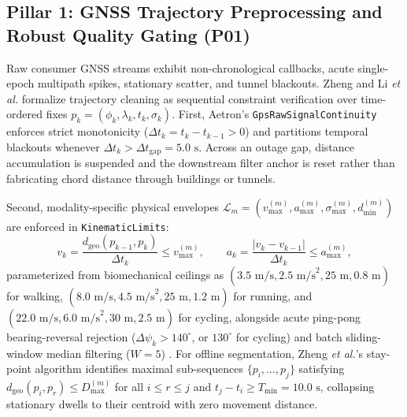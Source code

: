 \documentclass[journal]{IEEEtran}
\begin{document}
\subsection{Pillar 1: GNSS Trajectory Preprocessing and Robust Quality Gating (P01)}
Raw consumer GNSS streams exhibit non-chronological callbacks, acute single-epoch multipath spikes, stationary scatter, and tunnel blackouts. Zheng \cite{zheng2015trajectory} and Li \emph{et al.} \cite{li2025trajectory} formalize trajectory cleaning as sequential constraint verification over time-ordered fixes $p_k = (\phi_k, \lambda_k, t_k, \sigma_k)$. First, Aetron's \texttt{GpsRawSignalContinuity} enforces strict monotonicity ($\Delta t_k = t_k - t_{k-1} > 0$) and partitions temporal blackouts whenever $\Delta t_k > \Delta t_{\text{gap}} = 5.0\text{ s}$. Across an outage gap, distance accumulation is suspended and the downstream filter anchor is reset rather than fabricating chord distance through buildings or tunnels.

Second, modality-specific physical envelopes $\mathcal{L}_m = (v_{\max}^{(m)}, a_{\max}^{(m)}, \sigma_{\max}^{(m)}, d_{\min}^{(m)})$ are enforced in \texttt{KinematicLimits}:
\begin{equation}
  v_k = \frac{d_{\text{geo}}(p_{k-1}, p_k)}{\Delta t_k} \le v_{\max}^{(m)}, \qquad
  a_k = \frac{|v_k - v_{k-1}|}{\Delta t_k} \le a_{\max}^{(m)},
  \label{eq:p01_kinematic}
\end{equation}
parameterized from biomechanical ceilings as $(3.5\text{ m/s}, 2.5\text{ m/s}^2, 25\text{ m}, 0.8\text{ m})$ for walking, $(8.0\text{ m/s}, 4.5\text{ m/s}^2, 25\text{ m}, 1.2\text{ m})$ for running, and $(22.0\text{ m/s}, 6.0\text{ m/s}^2, 30\text{ m}, 2.5\text{ m})$ for cycling, alongside acute ping-pong bearing-reversal rejection ($\Delta\psi_k > 140^\circ$, or $130^\circ$ for cycling) and batch sliding-window median filtering ($W = 5$) \cite{zheng2015trajectory,li2025trajectory}. For offline segmentation, Zheng \emph{et al.}'s stay-point algorithm \cite{zheng2009mining} identifies maximal sub-sequences $\{p_i,\dots,p_j\}$ satisfying $d_{\text{geo}}(p_i, p_r) \le D_{\max}^{(m)}$ for all $i \le r \le j$ and $t_j - t_i \ge T_{\min} = 10.0\text{ s}$, collapsing stationary dwells to their centroid with zero movement distance.
\end{document}
